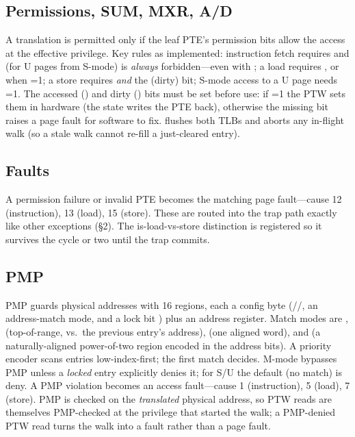 \subsection{Permissions, SUM, MXR, A/D}
A translation is permitted only if the leaf PTE's permission bits allow the
access at the effective privilege. Key rules as implemented: instruction fetch
requires  and (for U pages from S-mode) is \emph{always} forbidden---even
with ; a load requires , or  when =1; a store
requires  \emph{and} the  (dirty) bit; S-mode access to a U page
needs =1. The accessed () and dirty () bits must be set
before use: if =1 the PTW sets them in hardware (the
 state writes the PTE back), otherwise the missing bit raises a
page fault for software to fix.  flushes both TLBs and aborts any
in-flight walk (so a stale walk cannot re-fill a just-cleared entry).

\subsection{Faults}
A permission failure or invalid PTE becomes the matching page fault---cause 12
(instruction), 13 (load), 15 (store). These are routed into the trap path exactly
like other exceptions (\S2). The is-load-vs-store distinction is registered so it
survives the cycle or two until the trap commits.

\subsection{PMP}
PMP guards physical addresses with 16 regions, each a config byte
(//, an address-match mode, and a lock bit ) plus an
address register. Match modes are ,  (top-of-range, vs.\ the
previous entry's address),  (one aligned word), and  (a
naturally-aligned power-of-two region encoded in the address bits). A priority
encoder scans entries low-index-first; the first match decides. M-mode bypasses
PMP unless a \emph{locked} entry explicitly denies it; for S/U the default (no
match) is deny. A PMP violation becomes an access fault---cause 1 (instruction),
5 (load), 7 (store). PMP is checked on the \emph{translated} physical address, so
PTW reads are themselves PMP-checked at the privilege that started the walk; a
PMP-denied PTW read turns the walk into a fault rather than a page fault.

